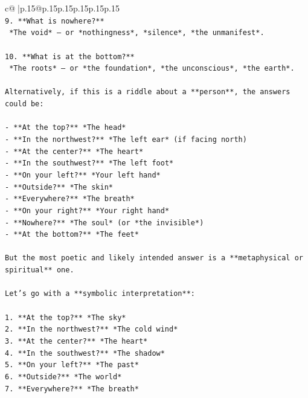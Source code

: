 \documentclass{article}
\begin{document}
{\begin{supertabular}{c@{$\;$}|p{.15\linewidth}@{}p{.15\linewidth}p{.15\linewidth}p{.15\linewidth}p{.15\linewidth}p{.15\linewidth}}
{{{\\ 
\texttt{9. **What is nowhere?**  } \\
\texttt{   *The void* — or *nothingness*, *silence*, *the unmanifest*.} \\
\\ 
\texttt{10. **What is at the bottom?**  } \\
\texttt{   *The roots* — or *the foundation*, *the unconscious*, *the earth*.} \\
\\ 
\texttt{Alternatively, if this is a riddle about a **person**, the answers could be:} \\
\\ 
\texttt{{-} **At the top?** *The head*  } \\
\texttt{{-} **In the northwest?** *The left ear* (if facing north)  } \\
\texttt{{-} **At the center?** *The heart*  } \\
\texttt{{-} **In the southwest?** *The left foot*  } \\
\texttt{{-} **On your left?** *Your left hand*  } \\
\texttt{{-} **Outside?** *The skin*  } \\
\texttt{{-} **Everywhere?** *The breath*  } \\
\texttt{{-} **On your right?** *Your right hand*  } \\
\texttt{{-} **Nowhere?** *The soul* (or *the invisible*)  } \\
\texttt{{-} **At the bottom?** *The feet*} \\
\\ 
\texttt{But the most poetic and likely intended answer is a **metaphysical or spiritual** one.} \\
\\ 
\texttt{Let’s go with a **symbolic interpretation**:} \\
\\ 
\texttt{1. **At the top?** *The sky*  } \\
\texttt{2. **In the northwest?** *The cold wind*  } \\
\texttt{3. **At the center?** *The heart*  } \\
\texttt{4. **In the southwest?** *The shadow*  } \\
\texttt{5. **On your left?** *The past*  } \\
\texttt{6. **Outside?** *The world*  } \\
\texttt{7. **Everywhere?** *The breath*  } \\
}}}
\end{supertabular}}
\end{document}
